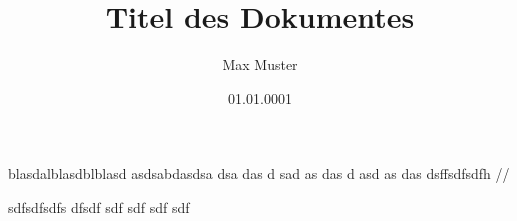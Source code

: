 \documentclass{scrbook}
\begin{document}
\title{Titel des Dokumentes}
\author{Max Muster}
\date{01.01.0001}
\maketitle
blasdalblasdblblasd
    asdsabdasdsa
    dsa
    das
    d
    sad
    as
    das
    d
    asd
    as
    das
    dsffsdfsdfh //

    sdfsdfsdfs
    dfsdf
    sdf
    sdf
    sdf
    sdf
\end{document}

